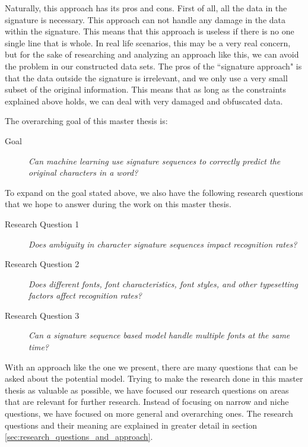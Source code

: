 Naturally, this approach has its pros and cons. First of all, all the data in the signature is necessary. This approach can not handle any damage in the data within the signature. This means that this approach is useless if there is no one single line that is whole. In real life scenarios, this may be a very real concern, but for the sake of researching and analyzing an approach like this, we can avoid the problem in our constructed data sets. The pros of the ``signature approach" is that the data outside the signature is irrelevant, and we only use a very small subset of the original information. This means that as long as the constraints explained above holds, we can deal with very damaged and obfuscated data.

The overarching goal of this master thesis is:

\begin{description}
    \item[Goal]{\textit{Can machine learning use signature sequences to correctly predict the original characters in a word?}}
\end{description}

To expand on the goal stated above, we also have the following research questions that we hope to answer during the work on this master thesis.

\begin{description}
    \item[Research Question 1]{\textit{Does ambiguity in character signature sequences impact recognition rates?}}
    \item[Research Question 2]{\textit{Does different fonts, font characteristics, font styles, and other typesetting factors affect recognition rates?}}
    \item[Research Question 3]{\textit{Can a signature sequence based model handle multiple fonts at the same time?}}
\end{description}

With an approach like the one we present, there are many questions that can be asked about the potential model. Trying to make the research done in this master thesis as valuable as possible, we have focused our research questions on areas that are relevant for further research. Instead of focusing on narrow and niche questions, we have focused on more general and overarching ones. The research questions and their meaning are explained in greater detail in section \ref{sec:research_questions_and_approach}.


